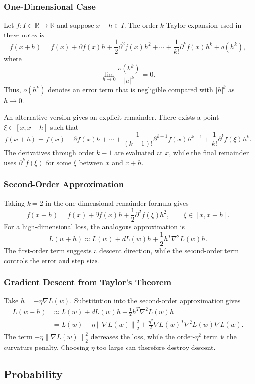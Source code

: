 \documentclass[12pt,oneside]{book}
\numberwithin{equation}{section}
\theoremstyle{definition}
\theoremstyle{plain}
\theoremstyle{remark}
\newcommand{\R}{\mathbb{R}}
\newcommand{\norm}[1]{\left\lVert #1 \right\rVert}
\begin{document}
\subsubsection{One-Dimensional Case}
Let $f\colon I\subset\R\to\R$ and suppose $x+h\in I$. The order-$k$ Taylor expansion used in these notes is
\[
f(x+h)
=f(x)+\partial f(x)h
+\frac{1}{2}\partial^2f(x)h^2
+\cdots
+\frac{1}{k!}\partial^kf(x)h^k
+o(h^k),
\]
where
\[
\lim_{h\to0}\frac{o(h^k)}{\lvert h\rvert^k}=0.
\]
Thus, $o(h^k)$ denotes an error term that is negligible compared with $\lvert h\rvert^k$ as $h\to0$.

An alternative version gives an explicit remainder. There exists a point $\xi\in[x,x+h]$ such that
\[
f(x+h)
=f(x)+\partial f(x)h+\cdots
+\frac{1}{(k-1)!}\partial^{k-1}f(x)h^{k-1}
+\frac{1}{k!}\partial^kf(\xi)h^k.
\]
The derivatives through order $k-1$ are evaluated at $x$, while the final remainder uses $\partial^kf(\xi)$ for some $\xi$ between $x$ and $x+h$.

\subsubsection{Second-Order Approximation}
Taking $k=2$ in the one-dimensional remainder formula gives
\[
f(x+h)=f(x)+\partial f(x)h
+\frac{1}{2}\partial^2f(\xi)h^2,
\qquad \xi\in[x,x+h].
\]
For a high-dimensional loss, the analogous approximation is
\[
L(w+h)\approx L(w)+dL(w)h
+\frac{1}{2}h^T\nabla^2L(w)h.
\]
The first-order term suggests a descent direction, while the second-order term controls the error and step size.

\subsubsection{Gradient Descent from Taylor's Theorem}
Take $h=-\eta\nabla L(w)$. Substitution into the second-order approximation gives
\begin{align*}
L(w+h)
&\approx L(w)+dL(w)h
+\frac{1}{2}h^T\nabla^2L(w)h\\
&=L(w)-\eta\norm{\nabla L(w)}_2^2
+\frac{\eta^2}{2}
\nabla L(w)^T\nabla^2L(w)\nabla L(w).
\end{align*}
The term $-\eta\norm{\nabla L(w)}_2^2$ decreases the loss, while the order-$\eta^2$ term is the curvature penalty. Choosing $\eta$ too large can therefore destroy descent.

\subsection{Probability}
\end{document}
